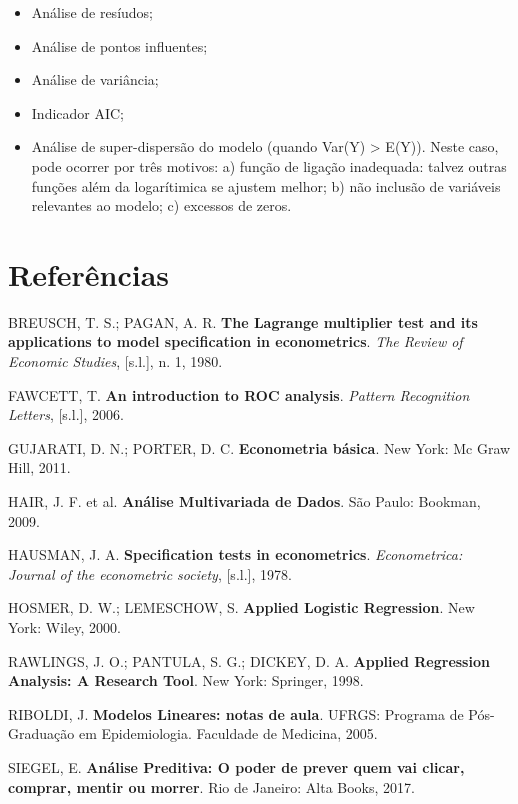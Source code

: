 \documentclass[12pt,brazil,oneside]{book}
\providecommand{\tightlist}{%
  \setlength{\itemsep}{0pt}\setlength{\parskip}{0pt}}
\begin{document}
\begin{itemize}
\tightlist
\item
  Análise de resíudos;
\item
  Análise de pontos influentes;
\item
  Análise de variância;
\item
  Indicador AIC;
\item
  Análise de super-dispersão do modelo (quando Var(Y) \textgreater{}
  E(Y)). Neste caso, pode ocorrer por três motivos: a) função de ligação
  inadequada: talvez outras funções além da logarítimica se ajustem
  melhor; b) não inclusão de variáveis relevantes ao modelo; c) excessos
  de zeros.
\end{itemize}

\hypertarget{referencias}{%
\chapter*{Referências}\label{referencias}}

\hypertarget{refs}{}
\leavevmode\hypertarget{ref-breusch1980}{}%
BREUSCH, T. S.; PAGAN, A. R. \textbf{The Lagrange multiplier test and
its applications to model specification in econometrics}. \emph{The
Review of Economic Studies}, {[}s.l.{]}, n. 1, 1980.

\leavevmode\hypertarget{ref-Fawcett2006}{}%
FAWCETT, T. \textbf{An introduction to ROC analysis}. \emph{Pattern
Recognition Letters}, {[}s.l.{]}, 2006.

\leavevmode\hypertarget{ref-Gujarati2011}{}%
GUJARATI, D. N.; PORTER, D. C. \textbf{Econometria básica}. New York: Mc
Graw Hill, 2011.

\leavevmode\hypertarget{ref-Hair2009}{}%
HAIR, J. F. et al. \textbf{Análise Multivariada de Dados}. São Paulo:
Bookman, 2009.

\leavevmode\hypertarget{ref-hausman1978}{}%
HAUSMAN, J. A. \textbf{Specification tests in econometrics}.
\emph{Econometrica: Journal of the econometric society}, {[}s.l.{]},
1978.

\leavevmode\hypertarget{ref-Hosmer2000}{}%
HOSMER, D. W.; LEMESCHOW, S. \textbf{Applied Logistic Regression}. New
York: Wiley, 2000.

\leavevmode\hypertarget{ref-penn2018}{}%

\leavevmode\hypertarget{ref-Rawlings1998}{}%
RAWLINGS, J. O.; PANTULA, S. G.; DICKEY, D. A. \textbf{Applied
Regression Analysis: A Research Tool}. New York: Springer, 1998.

\leavevmode\hypertarget{ref-Riboldi2005}{}%
RIBOLDI, J. \textbf{Modelos Lineares: notas de aula}. UFRGS: Programa de
Pós-Graduação em Epidemiologia. Faculdade de Medicina, 2005.

\leavevmode\hypertarget{ref-Siegel2017}{}%
SIEGEL, E. \textbf{Análise Preditiva: O poder de prever quem vai clicar,
comprar, mentir ou morrer}. Rio de Janeiro: Alta Books, 2017.

\leavevmode\hypertarget{ref-Torres-Reyna2014}{}%
\end{document}
